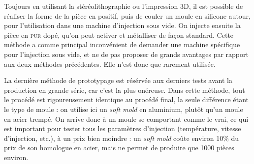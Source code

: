 Toujours en utilisant la stéréolithographie ou l'impression 3D, il est possible de réaliser la forme de la pièce en positif, puis de couler un moule en silicone autour, pour l'utilisation dans une machine d'injection sous vide.
On injecte ensuite la pièce en \textsc{pur} dopé, qu'on peut activer et métalliser de façon standard.
Cette méthode a comme principal inconvénient de demander une machine spécifique pour l'injection sous vide, et ne de pas proposer de grands avantages par rapport aux deux méthodes précédentes.
Elle n'est donc que rarement utilisée.

La dernière méthode de prototypage est résérvée aux derniers tests avant la production en grande série, car c'est la plus onéreuse.
Dans cette méthode, tout le procédé est rigoureusement identique au procédé final, la seule différence étant le type de moule : on utilise ici un \textit{soft mold} en aluminium, plutôt qu'un moule en acier trempé.
On arrive donc à un moule se comportant comme le vrai, ce qui est important pour tester tous les paramètres d'injection (température, vitesse d'injection, etc.), à un prix bien moindre : un \textit{soft mold} coûte environ 10\% du prix de son homologue en acier, mais ne permet de produire que 1000 pièces environ.
